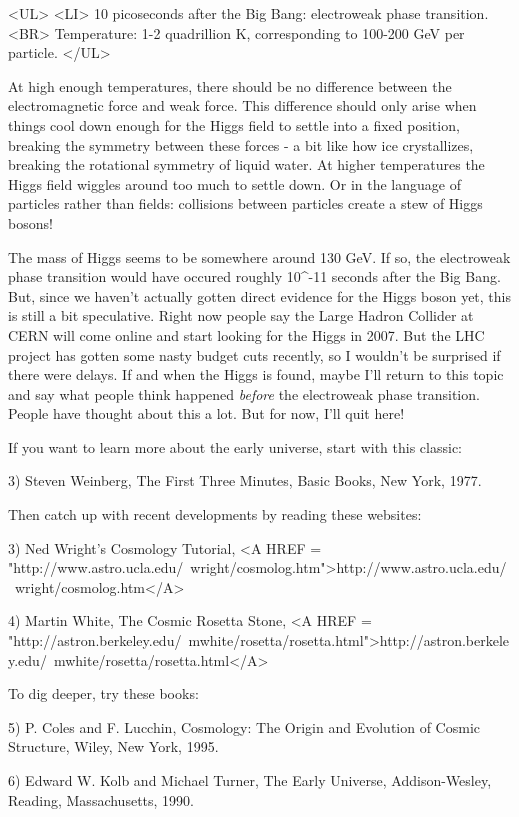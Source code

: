 <UL>
<LI>
10 picoseconds after the Big Bang: electroweak phase transition.<BR>
Temperature: 1-2 quadrillion K, corresponding to 100-200 GeV per particle.
</UL>

At high enough temperatures, there should be no difference between the
electromagnetic force and weak force.  This difference should only
arise when things cool down enough for the Higgs field to settle into
a fixed position, breaking the symmetry between these forces - a bit
like how ice crystallizes, breaking the rotational symmetry of liquid
water.  At higher temperatures the Higgs field wiggles around too
much to settle down.  Or in the language of particles rather than
fields: collisions between particles create a stew of Higgs bosons!

The mass of Higgs seems to be somewhere around 130 GeV.  If so, the
electroweak phase transition would have occured roughly 10^{-11}
seconds after the Big Bang.  But, since we haven't actually gotten
direct evidence for the Higgs boson yet, this is still a bit
speculative.  Right now people say the Large Hadron Collider at CERN
will come online and start looking for the Higgs in 2007.  But the LHC
project has gotten some nasty budget cuts recently, so I wouldn't be
surprised if there were delays.  If and when the Higgs is found, maybe
I'll return to this topic and say what people think happened \emph{before}
the electroweak phase transition.  People have thought about this a
lot.  But for now, I'll quit here!

If you want to learn more about the early universe, start with
this classic:

3) Steven Weinberg, The First Three Minutes, Basic Books, New York,
1977.

Then catch up with recent developments by reading these websites:

3) Ned Wright's Cosmology Tutorial, 
<A HREF = "http://www.astro.ucla.edu/~wright/cosmolog.htm">http://www.astro.ucla.edu/~wright/cosmolog.htm</A>

4) Martin White, The Cosmic Rosetta Stone, 
<A HREF = "http://astron.berkeley.edu/~mwhite/rosetta/rosetta.html">http://astron.berkeley.edu/~mwhite/rosetta/rosetta.html</A>

To dig deeper, try these books:

5) P. Coles and F. Lucchin, Cosmology: The Origin and Evolution
of Cosmic Structure, Wiley, New York, 1995.

6) Edward W. Kolb and Michael Turner, The Early Universe, 
Addison-Wesley, Reading, Massachusetts, 1990.

